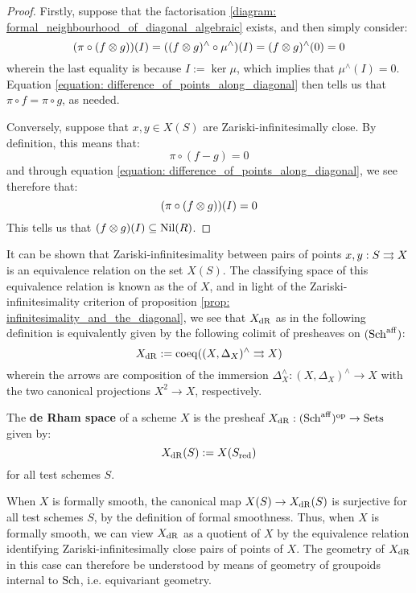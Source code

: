 \begin{proof}
                Firstly, suppose that the factorisation \eqref{diagram: formal_neighbourhood_of_diagonal_algebraic} exists, and then simply consider:
                    $$(\pi \circ (f \tensor g))(I) = ( (f \tensor g)^{\wedge} \circ \mu^{\wedge} )(I) = (f \tensor g)^{\wedge}(0) = 0$$
                wherein the last equality is because $I := \ker \mu$, which implies that $\mu^{\wedge}(I) = 0$. Equation \eqref{equation: difference_of_points_along_diagonal} then tells us that $\pi \circ f = \pi \circ g$, as needed.

                Conversely, suppose that $x, y \in X(S)$ are Zariski-infinitesimally close. By definition, this means that:
                    $$\pi \circ (f - g) = 0$$
                and through equation \eqref{equation: difference_of_points_along_diagonal}, we see therefore that:
                    $$(\pi \circ (f \tensor g))(I) = 0$$
                This tells us that $(f \tensor g)(I) \subseteq \Nil(R)$. 
            \end{proof}

        It can be shown that Zariski-infinitesimality between pairs of points $x, y: S \rightrightarrows X$ is an equivalence relation on the set $X(S)$. The classifying space of this equivalence relation is known as the  of $X$, and in light of the Zariski-infinitesimality criterion of proposition \ref{prop: infinitesimality_and_the_diagonal}, we see that $X_{\mathrm{dR}}$ as in the following definition is equivalently given by the following colimit of presheaves on $(\mathrm{Sch}^{\mathrm{aff}})$:
            $$X_{\mathrm{dR}} := \operatorname{coeq}( (X, \Delta_X)^{\wedge} \rightrightarrows X )$$
        wherein the arrows are composition of the immersion $\Delta_X^{\wedge}: (X, \Delta_X)^{\wedge} \to X$ with the two canonical  projections $X^2 \to X$, respectively.
        \begin{definition} \label{def: de_rham_spaces}
            The \textbf{de Rham space} of a scheme $X$ is the presheaf $X_{\mathrm{dR}}: (\mathrm{Sch}^{\mathrm{aff}})^{\mathrm{op}} \to \mathrm{Sets}$ given by:
                $$X_{\mathrm{dR}}(S) := X(S_{\mathrm{red}})$$
            for all test schemes $S$.
        \end{definition}

        When $X$ is formally smooth, the canonical map $X(S) \to X_{\mathrm{dR}}(S)$ is surjective for all test schemes $S$, by the definition of formal smoothness. Thus, when $X$ is formally smooth, we can view $X_{\mathrm{dR}}$ as a quotient of $X$ by the equivalence relation identifying Zariski-infinitesimally close pairs of points of $X$. The geometry of $X_{\mathrm{dR}}$ in this case can therefore be understood by means of geometry of groupoids internal to $\mathrm{Sch}$, i.e. equivariant geometry.

